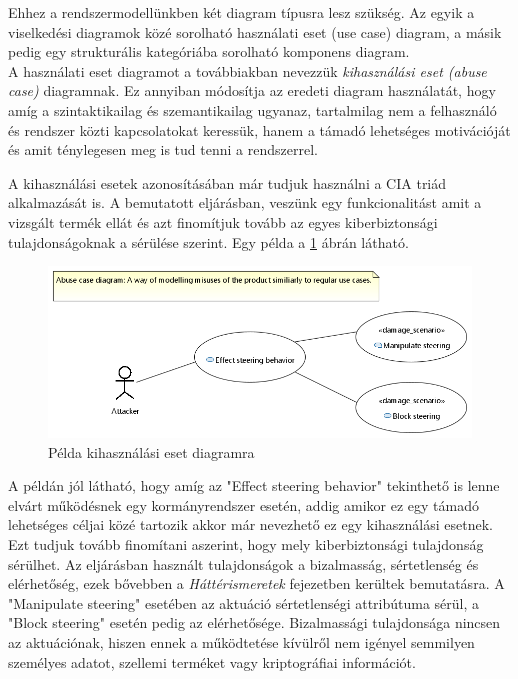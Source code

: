 Ehhez a rendszermodellünkben két diagram típusra lesz szükség. Az egyik a viselkedési diagramok közé sorolható használati eset (use case) diagram, a másik pedig egy strukturális kategóriába sorolható komponens diagram.\\

A használati eset diagramot a továbbiakban nevezzük \textit{kihasználási eset (abuse case)} diagramnak. Ez annyiban módosítja az eredeti diagram használatát, hogy amíg a szintaktikailag és szemantikailag ugyanaz, tartalmilag nem a felhasználó és rendszer közti kapcsolatokat keressük, hanem a támadó lehetséges motivációját és amit ténylegesen meg is tud tenni a rendszerrel. 

A kihasználási esetek azonosításában már tudjuk használni a CIA triád alkalmazását is. A bemutatott eljárásban, veszünk egy funkcionalitást amit a vizsgált termék ellát és azt finomítjuk tovább az egyes kiberbiztonsági tulajdonságoknak a sérülése szerint. Egy példa a \ref{fig:04_abuse_case} ábrán látható.

\begin{figure}[!ht]
	\centering
	\includegraphics[width=130mm, keepaspectratio]{figures/04_abuse_case.png}
	\caption{Példa kihasználási eset diagramra}
	\label{fig:04_abuse_case}
\end{figure}

A példán jól látható, hogy amíg az "Effect steering behavior" tekinthető is lenne elvárt működésnek egy kormányrendszer esetén, addig amikor ez egy támadó lehetséges céljai közé tartozik akkor már nevezhető ez egy kihasználási esetnek. Ezt tudjuk tovább finomítani aszerint, hogy mely kiberbiztonsági tulajdonság sérülhet. Az eljárásban használt tulajdonságok a bizalmasság, sértetlenség és elérhetőség, ezek bővebben a \textit{Háttérismeretek} fejezetben kerültek bemutatásra. A "Manipulate steering" esetében az aktuáció sértetlenségi attribútuma sérül, a "Block steering" esetén pedig az elérhetősége. Bizalmassági tulajdonsága nincsen az aktuációnak, hiszen ennek a működtetése kívülről nem igényel semmilyen személyes adatot, szellemi terméket vagy kriptográfiai információt.

